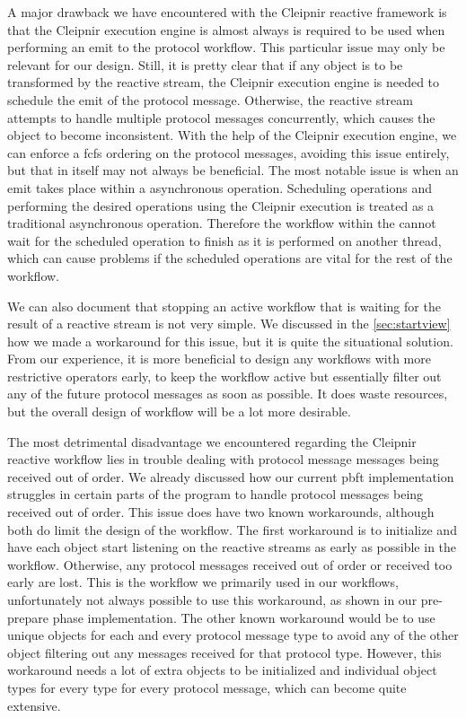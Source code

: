A major drawback we have encountered with the Cleipnir reactive framework is that the Cleipnir execution engine is almost always is required to be used when performing an emit to the protocol workflow. This particular issue may only be relevant for our design. Still, it is pretty clear that if any object is to be transformed by the reactive stream, the Cleipnir execution engine is needed to schedule the emit of the protocol message. Otherwise, the reactive stream attempts to handle multiple protocol messages concurrently, which causes the object to become inconsistent. With the help of the Cleipnir execution engine, we can enforce a \ac{fcfs} ordering on the protocol messages, avoiding this issue entirely, but that in itself may not always be beneficial. The most notable issue is when an emit takes place within a  asynchronous operation. Scheduling operations and performing the desired operations using the Cleipnir execution is treated as a traditional asynchronous operation. Therefore the workflow within the  cannot wait for the scheduled operation to finish as it is performed on another thread, which can cause problems if the scheduled operations are vital for the rest of the workflow. 

We can also document that stopping an active workflow that is waiting for the result of a reactive stream is not very simple. We discussed in the \autoref{sec:startview} how we made a workaround for this issue, but it is quite the situational solution. From our experience, it is more beneficial to design any workflows with more restrictive  operators early, to keep the workflow active but essentially filter out any of the future protocol messages as soon as possible. It does waste resources, but the overall design of workflow will be a lot more desirable. 

The most detrimental disadvantage we encountered regarding the Cleipnir reactive workflow lies in trouble dealing with protocol message messages being received out of order. We already discussed how our current \ac{pbft} implementation struggles in certain parts of the program to handle protocol messages being received out of order. This issue does have two known workarounds, although both do limit the design of the workflow. The first workaround is to initialize and have each  object start listening on the reactive streams as early as possible in the workflow. Otherwise, any protocol messages received out of order or received too early are lost. This is the workflow we primarily used in our workflows, unfortunately not always possible to use this workaround, as shown in our pre-prepare phase implementation. The other known workaround would be to use unique  objects for each and every protocol message type to avoid any of the other  object filtering out any messages received for that protocol type. However, this workaround needs a lot of extra  objects to be initialized and individual object types for every type for every protocol message, which can become quite extensive.


